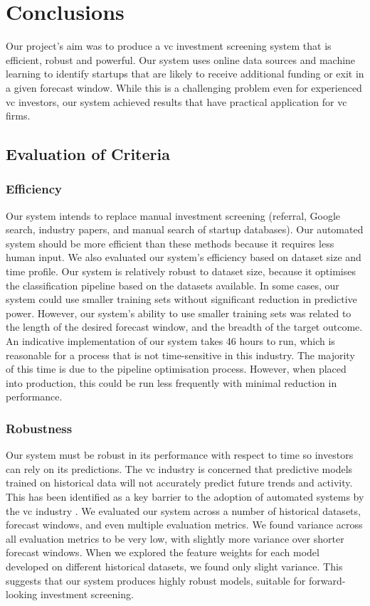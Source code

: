 \documentclass[../thesis/thesis.tex]{subfiles}
\begin{document}
 \chapter{Conclusions}
 \label{chap:conclusions}

Our project's aim was to produce a \gls{vc} investment screening system that is efficient, robust and powerful. Our system uses online data sources and machine learning to identify startups that are likely to receive additional funding or exit in a given forecast window. While this is a challenging problem even for experienced \gls{vc} investors, our system achieved results that have practical application for \gls{vc} firms.

\section{Evaluation of Criteria}

\subsection{Efficiency}

Our system intends to replace manual investment screening (referral, Google search, industry papers, and manual search of startup databases). Our automated system should be more efficient than these methods because it requires less human input. We also evaluated our system's efficiency based on dataset size and time profile. Our system is relatively robust to dataset size, because it optimises the classification pipeline based on the datasets available. In some cases, our system could use smaller training sets without significant reduction in predictive power. However, our system's ability to use smaller training sets was related to the length of the desired forecast window, and the breadth of the target outcome. An indicative implementation of our system takes 46 hours to run, which is reasonable for a process that is not time-sensitive in this industry. The majority of this time is due to the pipeline optimisation process. However, when placed into production, this could be run less frequently with minimal reduction in performance.

\subsection{Robustness}

Our system must be robust in its performance with respect to time so investors can rely on its predictions. The \gls{vc} industry is concerned that predictive models trained on historical data will not accurately predict future trends and activity. This has been identified as a key barrier to the adoption of automated systems by the \gls{vc} industry \cite{stone2014}. We evaluated our system across a number of historical datasets, forecast windows, and even multiple evaluation metrics. We found variance across all evaluation metrics to be very low, with slightly more variance over shorter forecast windows. When we explored the feature weights for each model developed on different historical datasets, we found only slight variance. This suggests that our system produces highly robust models, suitable for forward-looking investment screening.
\end{document}
